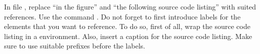 In file , replace \enquote{in the figure} and \enquote{the following source code listing} with suited references. 
Use the command . Do not forget to first introduce labels for the elements that you want to reference. To do so, first of all, wrap the source code listing in a  environment.
Also, insert a caption for the source code listing. 
Make sure to use suitable prefixes before the labels.

